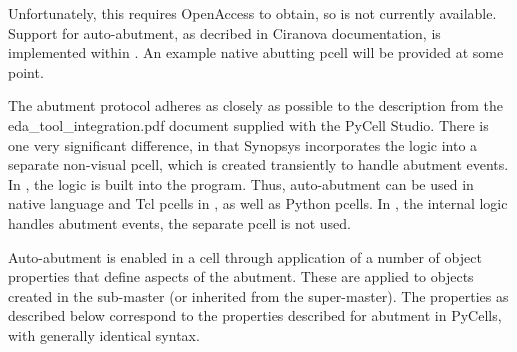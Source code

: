 \else

Unfortunately, this requires OpenAccess to obtain, so is not currently
available.  Support for auto-abutment, as decribed in Ciranova
documentation, is implemented within {\Xic}.  An example native
abutting pcell will be provided at some point.
\fi

The abutment protocol adheres as closely as possible to the
description from the {\vt eda\_tool\_integration.pdf} document
supplied with the PyCell Studio.  There is one very significant
difference, in that Synopsys incorporates the logic into a separate
non-visual pcell, which is created transiently to handle abutment
events.  In {\Xic}, the logic is built into the program.  Thus,
auto-abutment can be used in native language and Tcl pcells in {\Xic},
as well as Python pcells.  In {\Xic}, the internal logic handles
abutment events, the separate pcell is not used.

Auto-abutment is enabled in a cell through application of a number of
object properties that define aspects of the abutment.  These are
applied to objects created in the sub-master (or inherited from the
super-master).  The {\Xic} properties as described below correspond to
the properties described for abutment in PyCells, with generally
identical syntax.

